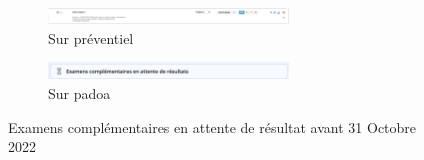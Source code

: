 \begin{figure}[h!]
    \centering
    \begin{subfigure}{\textwidth}
        \centering
        \includegraphics[width=0.7\textwidth]{4_attachments/figures/prev_bef.png} %
        \caption{Sur préventiel}
        \label{fig:image1}
    \end{subfigure}
    
    \vspace{1cm} %
    
    \begin{subfigure}{\textwidth}
        \centering
        \includegraphics[width=0.7\textwidth]{4_attachments/figures/padoa_bef.png} %
        \caption{Sur padoa}
        \label{fig:image2}
    \end{subfigure}
    
    \caption{Examens complémentaires en attente de résultat avant 31 Octobre 2022}
    \label{fig:stacked_images}
\end{figure}

